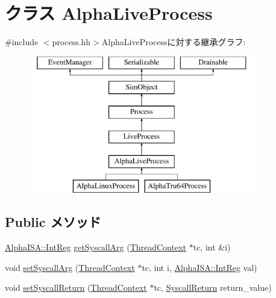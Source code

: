 \hypertarget{classAlphaLiveProcess}{
\section{クラス AlphaLiveProcess}
\label{classAlphaLiveProcess}
}


{\ttfamily \#include $<$process.hh$>$}AlphaLiveProcessに対する継承グラフ:\begin{figure}[H]
\begin{center}
\leavevmode
\includegraphics[height=6cm]{classAlphaLiveProcess}
\end{center}
\end{figure}
\subsection*{Public メソッド}
\begin{DoxyCompactItemize}
\item 
\hyperlink{namespaceAlphaISA_a0e080577527fb3e9685399f75b5caf15}{AlphaISA::IntReg} \hyperlink{classAlphaLiveProcess_afcdc0ffa30f2ddff7b435be15da7a6af}{getSyscallArg} (\hyperlink{classThreadContext}{ThreadContext} $\ast$tc, int \&i)
\item 
void \hyperlink{classAlphaLiveProcess_aeaf2b415297449d001c053d7d0d95586}{setSyscallArg} (\hyperlink{classThreadContext}{ThreadContext} $\ast$tc, int i, \hyperlink{namespaceAlphaISA_a0e080577527fb3e9685399f75b5caf15}{AlphaISA::IntReg} val)
\item 
void \hyperlink{classAlphaLiveProcess_aaefd02663c1eae206b851290d9276a5e}{setSyscallReturn} (\hyperlink{classThreadContext}{ThreadContext} $\ast$tc, \hyperlink{classSyscallReturn}{SyscallReturn} return\_\-value)
\end{DoxyCompactItemize}
